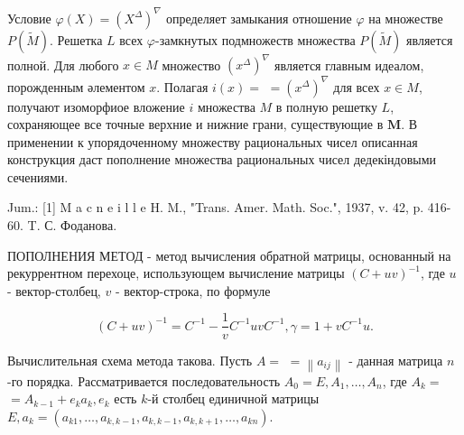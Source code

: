 \documentclass[10pt]{article}
\begin{document}
Условие $\varphi(X)=\left(X^{\Delta}\right)^{\nabla}$ определяет замыкания отношение $\varphi$ на множестве $P(\tilde{M})$. Решетка $L$ всех $\varphi$-замкнутых подмножеств множества $P(\tilde{M})$ является полной. Для любого $x \in M$ множество $\left(x^{\Delta}\right)^{\nabla}$ является главным идеалом, порожденным әлементом $x$. Полагая $i(x)=$ $=\left(x^{\Delta}\right)^{\nabla}$ для всех $x \in M$, получают изоморфиое вложение $i$ множества $M$ в полную решетку $L$, сохраняющее все точные верхние и нижние грани, существующие в $\boldsymbol{M}$. В применении к упорядоченному множеству рациональных чисел описанная конструкция даст пополнение множества рациональных чисел дедекіндовыми сечениями.



Jum.: [1] M a c n e i l l e H. M., "Trans. Amer. Math. Soc.", 1937, v. 42, p. 416-60. T. С. Фоданова.



ПОПОЛНЕНИЯ МЕТОД - метод вычисления обратной матрицы, основанный на рекуррентном перехоце, использующем вычисление матрицы $(C+u v)^{-1}$, где $u$ - вектор-столбец, $v$ - вектор-строка, по формуле



\[

(C+u v)^{-1}=C^{-1}-\frac{1}{v} C^{-1} u v C^{-1}, \gamma=1+v C^{-1} u .

\]



Вычислительная схема метода такова. Пусть $A=$ $=\left\|a_{i j}\right\|$ - данная матрица $n$-го порядка. Рассматривается последовательность $A_{0}=E, A_{1}, \ldots, A_{n}$, где $A_{k}=$ $=A_{k-1}+e_{k} a_{k}, e_{k}$ есть $k$-й столбец единичной матрицы $E, a_{k}=\left(a_{k 1}, \ldots, a_{k, k-1}, a_{k, k-1}, a_{k, k+1}, \ldots, a_{k n}\right)$.
\end{document}
